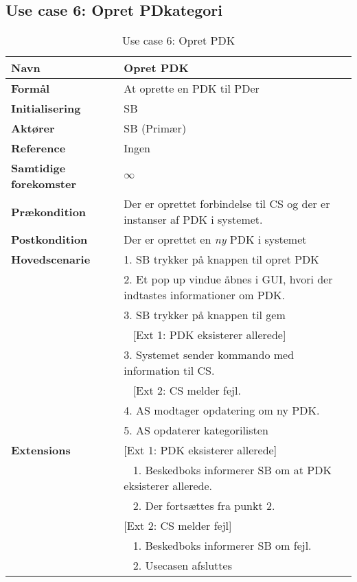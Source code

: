 \subsection{Use case 6: Opret \gls{PD}kategori}


\begin{table}[H]
\begin{tabularx}{\textwidth}{|l|X|}
\hline
\textbf{Navn}					& Opret \gls{PDK} \\\hline
\textbf{Formål}					& At oprette en \gls{PDK} til \gls{PD}er \\\hline
\textbf{Initialisering}			& \gls{SB} \\\hline
\textbf{Aktører}				& \gls{SB} (Primær)\\\hline
\textbf{Reference}				& Ingen \\\hline
								
\textbf{Samtidige forekomster}	& $\infty$ \\\hline

\textbf{Prækondition}			& Der er oprettet forbindelse til \gls{CS} og der er instanser af \gls{PDK} i systemet. \\\hline

\textbf{Postkondition}			& Der er oprettet en \textit{ny} \gls{PDK} i systemet \\\hline

\textbf{Hovedscenarie}			& 1. \gls{SB} trykker på knappen til opret \gls{PDK} \\		
								& 2. Et pop up vindue åbnes i \gls{GUI}, hvori der indtastes informationer om \gls{PDK}.\\
								& 3. \gls{SB} trykker på knappen til gem\\
								& ~ [Ext 1: \gls{PDK} eksisterer allerede]\\
								& 3. Systemet sender kommando med information til \gls{CS}. \\
								& ~ [Ext 2: \gls{CS} melder fejl.\\
								& 4. \gls{AS} modtager opdatering om ny \gls{PDK}. \\
								& 5. \gls{AS} opdaterer kategorilisten \\\hline

\textbf{Extensions}				
								& [Ext 1: \gls{PDK} eksisterer allerede] \\	
								& ~ 1. Beskedboks informerer \gls{SB} om at \gls{PDK} eksisterer allerede.\\
								& ~ 2. Der fortsættes fra punkt 2.\\
								 		
								& [Ext 2: \gls{CS} melder fejl] \\
								& ~ 1. Beskedboks informerer \gls{SB} om fejl. \\
								& ~ 2. Usecasen afsluttes \\\hline
\end{tabularx}
\caption{Use case 6: Opret \gls{PDK}}
\label{tab:UCopk}
\end{table}